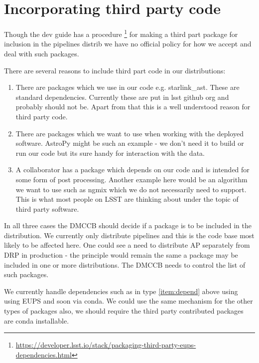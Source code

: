 \section{Incorporating third party code } \label{sec:party3}

Though the dev guide has a procedure \footnote{\url{https://developer.lsst.io/stack/packaging-third-party-eups-dependencies.html}}
for making a third part package for inclusion in the pipelines distrib we have no official policy for how we accept and deal with such packages.



There are several reasons to include third part code in our distributions:
\begin{enumerate}
\item There are packages which we use in our code e.g. starlink\_ast.  These are standard dependencies.  Currently these are put in lsst github org and probably should not be. Apart from that this is a well understood reason for third party code. \label{item:depend}
\item There are packages which we want to use when working with the deployed software. AstroPy might be such an example - we don't need it to build or run our code but its sure handy for interaction with the data.\label{item:want}
\item A collaborator has a package which depends on our code and is intended for some form of post processing. Another example here would be an algorithm we want to use such as ngmix which we do not necessarily need to support. This is what most people on LSST are thinking about under the topic of third party software. \label{item:colab}
\end{enumerate}


In all three cases the DMCCB should decide if a package is to be included in the distribution. We currently only distribute pipelines and this is the code base most likely to be affected here. One could see a need to distribute AP separately from DRP in production - the principle would remain the same a package may be included in one or more distributions. The DMCCB needs to control the list of such packages.

We currently handle dependencies such as in type \ref{item:depend} above using using EUPS and soon via conda. We could use the same mechanism for the other types of packages also,
we should require the third party contributed packages are conda installable.


